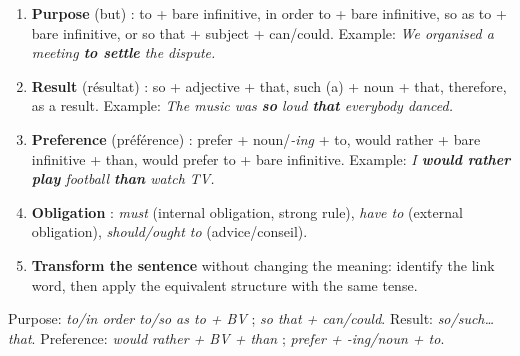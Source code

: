 \documentclass[11pt]{article}
\newcommand{\cle}[1]{{\popxbold\color{popdark}#1}}
\begin{document}
\begin{methode}
\begin{enumerate}
\item \textbf{Purpose} (but) : \cle{to + bare infinitive}, \cle{in order to + bare infinitive}, \cle{so as to + bare infinitive}, or \cle{so that + subject + can/could}. Example: \emph{We organised a meeting \textbf{to settle} the dispute.}
\item \textbf{Result} (résultat) : \cle{so + adjective + that}, \cle{such (a) + noun + that}, \cle{therefore}, \cle{as a result}. Example: \emph{The music was \textbf{so} loud \textbf{that} everybody danced.}
\item \textbf{Preference} (préférence) : \cle{prefer + noun/\emph{-ing} + to}, \cle{would rather + bare infinitive + than}, \cle{would prefer to + bare infinitive}. Example: \emph{I \textbf{would rather play} football \textbf{than} watch TV.}
\item \textbf{Obligation} : \emph{must} (internal obligation, strong rule), \emph{have to} (external obligation), \emph{should/ought to} (advice/conseil).
\item \textbf{Transform the sentence} without changing the meaning: identify the link word, then apply the equivalent structure with the same tense.
\end{enumerate}
\begin{aretenir}
Purpose: \emph{to/in order to/so as to + BV} ; \emph{so that + can/could}. Result: \emph{so/such\ldots that}. Preference: \emph{would rather + BV + than} ; \emph{prefer + -ing/noun + to}.
\end{aretenir}
\end{methode}
\end{document}
